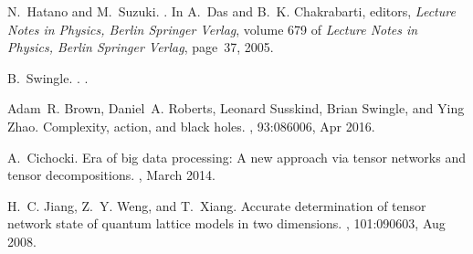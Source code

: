 \documentclass[preprint,3p,times,preprint,showpacs,amsmath,superscriptaddress,floatfix]{elsarticle}
\newcounter{bla}
\begin{document}
\begin{thebibliography}{10}
N.~{Hatano} and M.~{Suzuki}.
.
\newblock In A.~{Das} and B.~K. {Chakrabarti}, editors, {\em Lecture Notes in
  Physics, Berlin Springer Verlag}, volume 679 of {\em Lecture Notes in
  Physics, Berlin Springer Verlag}, page~37, 2005.

B.~Swingle.
.
.

Adam~R. Brown, Daniel~A. Roberts, Leonard Susskind, Brian Swingle, and Ying
  Zhao.
\newblock Complexity, action, and black holes.
, 93:086006, Apr 2016.

A.~Cichocki.
\newblock Era of big data processing: A new approach via tensor networks and
  tensor decompositions.
, March 2014.

H.~C. Jiang, Z.~Y. Weng, and T.~Xiang.
\newblock Accurate determination of tensor network state of quantum lattice
  models in two dimensions.
, 101:090603, Aug 2008.

\end{thebibliography}
\end{document}
